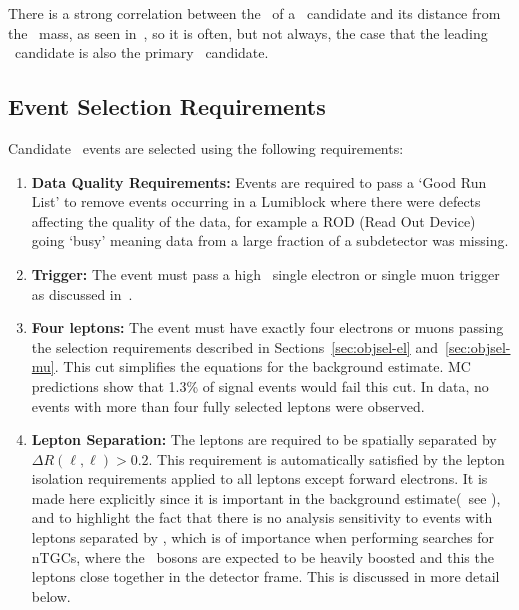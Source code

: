 There is a strong correlation between the \pt\ of a \Z\ candidate and its distance
from the \Z\ mass, as seen in~,
so it is often, but not always, the case that the leading \Z\ candidate is also the primary
\Z\ candidate.

\subsection{Event Selection Requirements}

Candidate \ZZ\ events are selected using the following requirements:

\begin{enumerate}

    \item {\bf Data Quality Requirements:} Events are required to pass a `Good
    Run List' to remove events occurring in a Lumiblock where there were defects
    affecting the quality of the data, for example a ROD (Read Out Device) going `busy' meaning
    data from a large fraction of a subdetector was missing.

    \item {\bf Trigger:} The event must pass a high \pt\ single electron or single
    muon trigger as discussed in~.

    \item {\bf Four leptons:} The event must have exactly four electrons or muons
    passing the selection requirements described in Sections~\ref{sec:objsel-el}
    and~\ref{sec:objsel-mu}. This cut simplifies the equations for the background
    estimate. MC predictions show that 1.3\% of signal events would fail this cut. In
    data, no events with more than four fully selected leptons were observed.

    \item {\bf Lepton Separation:} The leptons are required to be spatially separated by
    $\Delta{R}(\ell,\ell)>0.2$. This requirement is automatically satisfied by
    the lepton isolation requirements applied to all leptons except forward
    electrons. It is made here explicitly since it is important in the
    background estimate(~see ), and to highlight the fact that there is no
    analysis sensitivity to events with leptons separated by ,
    which is of importance when performing searches for nTGCs, where the \Z\
    bosons are expected to be heavily boosted and this the leptons close
    together in the detector frame. This is discussed in more detail below.


\end{enumerate}
